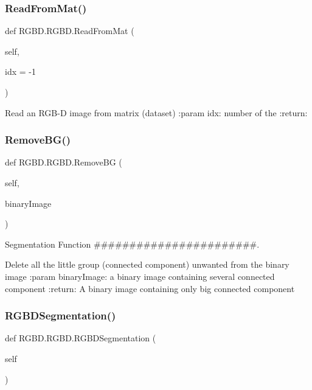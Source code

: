 \subsubsection{\texorpdfstring{Read\+From\+Mat()}{ReadFromMat()}}
{\footnotesize\ttfamily def R\+G\+B\+D.\+R\+G\+B\+D.\+Read\+From\+Mat (\begin{DoxyParamCaption}\item[{}]{self,  }\item[{}]{idx = {\ttfamily -\/1} }\end{DoxyParamCaption})}

\begin{DoxyVerb}Read an RGB-D image from matrix (dataset)
:param idx: number of the
:return:
\end{DoxyVerb}
 \mbox{\label{class_r_g_b_d_1_1_r_g_b_d_ad9260800129b014cc2b56acfe0f1bd0e}} 
\subsubsection{\texorpdfstring{Remove\+B\+G()}{RemoveBG()}}
{\footnotesize\ttfamily def R\+G\+B\+D.\+R\+G\+B\+D.\+Remove\+BG (\begin{DoxyParamCaption}\item[{}]{self,  }\item[{}]{binary\+Image }\end{DoxyParamCaption})}



Segmentation Function \#\#\#\#\#\#\#\#\#\#\#\#\#\#\#\#\#\#\#\#\#\#\#. 

\begin{DoxyVerb}Delete all the little group (connected component) unwanted from the binary image
:param binaryImage: a binary image containing several connected component
:return: A binary image containing only big connected component
\end{DoxyVerb}
 \mbox{\label{class_r_g_b_d_1_1_r_g_b_d_a543187dff5889d3aab9f613d1bc95c8f}} 
\subsubsection{\texorpdfstring{R\+G\+B\+D\+Segmentation()}{RGBDSegmentation()}}
{\footnotesize\ttfamily def R\+G\+B\+D.\+R\+G\+B\+D.\+R\+G\+B\+D\+Segmentation (\begin{DoxyParamCaption}\item[{}]{self }\end{DoxyParamCaption})}

